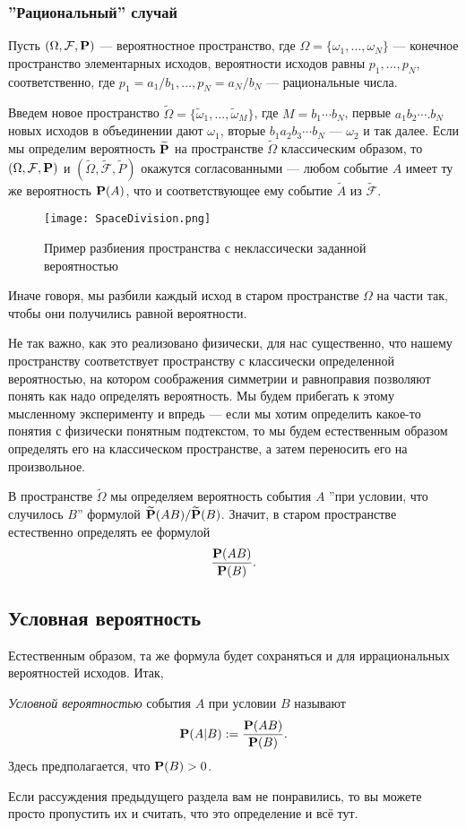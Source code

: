 \documentclass[11 pt,russian]{article}
\begin{document}
\subsubsection{''Рациональный'' случай}
Пусть $(\Omega,\mathcal{F},{\bf P})$ --- вероятностное пространство, где $\Omega=\{\omega_1,\dotsc,\omega_N\}$ --- конечное пространство элементарных исходов, вероятности исходов равны $p_1,\dotsc,p_N$, соответственно, где $p_1=a_1/b_1,\dotsc,p_N = a_N/b_N$ --- рациональные числа. 

Введем новое пространство $\widetilde{\Omega} = \{\widetilde{\omega}_1,\dotsc,\widetilde{\omega}_M\}$, где $M = b_1 \dotsm b_N$, первые $a_1 b_2 \dotsm. b_N$ новых исходов в объединении дают $\omega_1$,  вторые $b_1 a_2 b_3 \dotsm b_N$ --- $\omega_2$ и так далее. Если мы определим вероятность $\widetilde{{\bf P}}$ на пространстве $\widetilde{\Omega}$ классическим образом, то $(\Omega,\mathcal{F},{\bf P})$ и $(\widetilde{\Omega},\widetilde{\mathcal{F}},\widetilde{P})$ окажутся согласованными --- любом событие $A$ имеет ту же вероятность ${\bf P}(A)$, что и соответствующее ему событие $\widetilde{A}$ из $\widetilde{\mathcal{F}}$. 
\begin{figure}[h!]
\caption{Пример разбиения пространства с неклассически заданной вероятностью}
   \begin{center}
   \texttt{[image: SpaceDivision.png]}
   \end{center}
\end{figure}
Иначе говоря, мы разбили каждый исход в старом пространстве $\Omega$ на части так, чтобы они получились равной вероятности.

Не так важно, как это реализовано физически, для нас существенно, что нашему пространству соответствует пространству с классически определенной вероятностью, на котором соображения симметрии и равноправия позволяют понять как надо определять вероятность. Мы будем прибегать к этому мысленному эксперименту и впредь --- если мы хотим определить какое-то понятия с физически понятным подтекстом, то мы будем естественным образом определять его на классическом пространстве, а затем переносить его на произвольное. 

В пространстве $\widetilde{\Omega}$ мы определяем вероятность события $A$ ''при условии, что случилось $B$'' формулой $\widetilde{{\bf P}}(AB)/\widetilde{{\bf P}}(B)$. Значит, в старом пространстве естественно определять ее формулой
$$
\frac{{\bf P}(AB)}{{\bf P}(B)}.
$$
\subsection{Условная вероятность}
\label{CondProb}
Естественным образом, та же формула будет сохраняться и для иррациональных вероятностей исходов. Итак,
\begin{Def}
{\it Условной вероятностью} события $A$ при условии $B$ называют
$$
{\bf P}(A|B):= \frac{{\bf P}(A B)}{{\bf P}(B)}.
$$
Здесь предполагается, что ${\bf P}(B)> 0$. 
\end{Def}
Если рассуждения предыдущего раздела вам не понравились, то вы можете просто пропустить их и считать, что это определение и всё тут.
\end{document}
